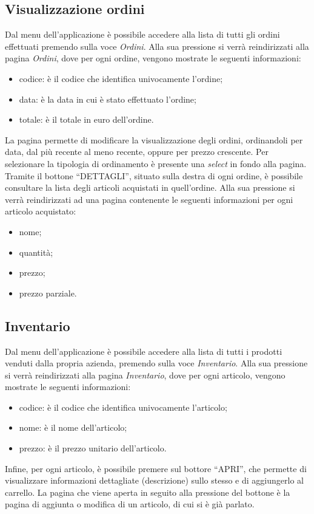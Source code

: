 \documentclass[12pt, a4paper, titlepage]{report}
\begin{document}
	\subsection{Visualizzazione ordini}
	Dal menu dell'applicazione è possibile accedere alla lista di tutti gli ordini effettuati premendo sulla voce \textit{Ordini}. Alla sua pressione si verrà reindirizzati alla pagina \textit{Ordini}, dove per ogni ordine, vengono mostrate le seguenti informazioni:
	\begin{itemize}
		\item codice: è il codice che identifica univocamente l'ordine;
		\item data: è la data in cui è stato effettuato l'ordine;
		\item totale: è il totale in euro dell'ordine.
	\end{itemize} 
	La pagina permette di modificare la visualizzazione degli ordini, ordinandoli per data, dal più recente al meno recente, oppure per prezzo crescente. Per selezionare la tipologia di ordinamento è presente una \textit{select} in fondo alla pagina.
	Tramite il bottone ``DETTAGLI'', situato sulla destra di ogni ordine, è possibile consultare la lista degli articoli acquistati in quell'ordine. Alla sua pressione si verrà reindirizzati ad una pagina contenente le seguenti informazioni per ogni articolo acquistato:
	\begin{itemize}
		\item nome;
		\item quantità;
		\item prezzo;
		\item prezzo parziale.
	\end{itemize}

	\subsection{Inventario}
	
	Dal menu dell'applicazione è possibile accedere alla lista di tutti i prodotti venduti dalla propria azienda, premendo sulla voce \textit{Inventario}. Alla sua pressione si verrà reindirizzati alla pagina \textit{Inventario}, dove per ogni articolo, vengono mostrate le seguenti informazioni:
	\begin{itemize}
		\item codice: è il codice che identifica univocamente l'articolo;
		\item nome: è il nome dell'articolo;
		\item prezzo: è il prezzo unitario dell'articolo.
	\end{itemize}
	Infine, per ogni articolo, è possibile premere sul bottore ``APRI'', che permette di visualizzare informazioni dettagliate (descrizione) sullo stesso e di aggiungerlo al carrello. La pagina che viene aperta in seguito alla pressione del bottone è la pagina di aggiunta o modifica di un articolo, di cui si è già parlato. 
	
\end{document}
